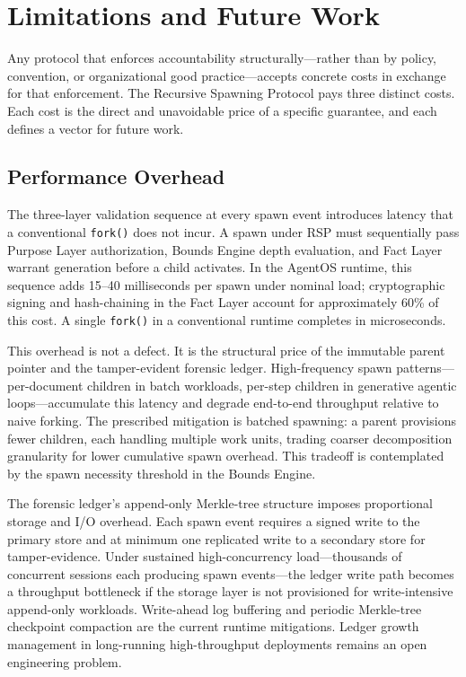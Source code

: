 \section{Limitations and Future Work}
\label{sec:rs-limitations}

Any protocol that enforces accountability structurally---rather than by policy, convention, or organizational good practice---accepts concrete costs in exchange for that enforcement. The Recursive Spawning Protocol pays three distinct costs. Each cost is the direct and unavoidable price of a specific guarantee, and each defines a vector for future work.

\subsection{Performance Overhead}
\label{sec:rs-perf-overhead}

The three-layer validation sequence at every spawn event introduces latency that a conventional \texttt{fork()} does not incur. A spawn under RSP must sequentially pass Purpose Layer authorization, Bounds Engine depth evaluation, and Fact Layer warrant generation before a child activates. In the AgentOS runtime, this sequence adds \numrange{15}{40} milliseconds per spawn under nominal load; cryptographic signing and hash-chaining in the Fact Layer account for approximately 60\% of this cost. A single \texttt{fork()} in a conventional runtime completes in microseconds.

This overhead is not a defect. It is the structural price of the immutable parent pointer and the tamper-evident forensic ledger. High-frequency spawn patterns---per-document children in batch workloads, per-step children in generative agentic loops---accumulate this latency and degrade end-to-end throughput relative to naive forking. The prescribed mitigation is batched spawning: a parent provisions fewer children, each handling multiple work units, trading coarser decomposition granularity for lower cumulative spawn overhead. This tradeoff is contemplated by the spawn necessity threshold in the Bounds Engine.

The forensic ledger's append-only Merkle-tree structure imposes proportional storage and I/O overhead. Each spawn event requires a signed write to the primary store and at minimum one replicated write to a secondary store for tamper-evidence. Under sustained high-concurrency load---thousands of concurrent sessions each producing spawn events---the ledger write path becomes a throughput bottleneck if the storage layer is not provisioned for write-intensive append-only workloads. Write-ahead log buffering and periodic Merkle-tree checkpoint compaction are the current runtime mitigations. Ledger growth management in long-running high-throughput deployments remains an open engineering problem.

